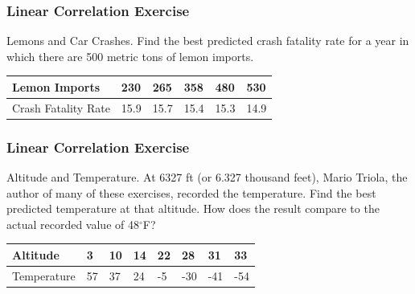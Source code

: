 \documentclass[xcolor=dvipsnames]{beamer}
\begin{document}
\begin{frame}
  \frametitle{Linear Correlation Exercise}
  Lemons and Car Crashes. Find the best predicted crash fatality rate
  for a year in which there are 500 metric tons of lemon imports.


  \bigskip

\begin{tabular}{|l|l|l|l|l|l|}
\hline
Lemon Imports & 230 & 265 & 358 & 480 & 530 \\
\hline
Crash Fatality Rate & 15.9 & 15.7 & 15.4 & 15.3 & 14.9 \\
\hline
\end{tabular}
\end{frame}



\begin{frame}
  \frametitle{Linear Correlation Exercise}
  Altitude and Temperature. At 6327 ft (or 6.327 thousand feet), Mario
  Triola, the author of many of these exercises, recorded the
  temperature. Find the best predicted temperature at that altitude.
  How does the result compare to the actual recorded value of 48$^{\circ}$F?


  \bigskip

\begin{tabular}{|l|l|l|l|l|l|l|l|}
\hline
Altitude & 3 & 10 & 14 & 22 & 28 & 31 & 33 \\
\hline
Temperature & 57 & 37 & 24 & -5 & -30 & -41 & -54 \\
\hline
\end{tabular}
\end{frame}
\end{document}
